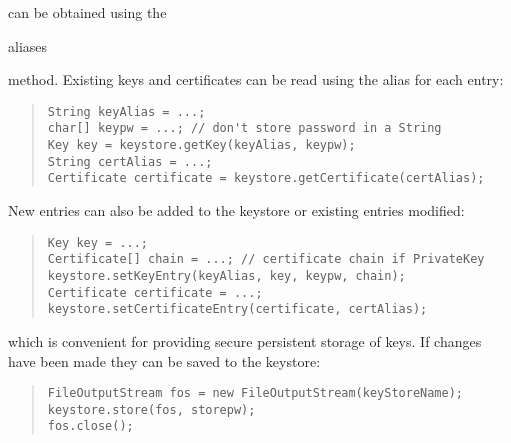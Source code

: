 can be obtained using the \begin{code}aliases\end{code} method.
Existing keys and certificates can be read using the alias for each entry:
\begin{quote}\begin{code}\begin{verbatim}
String keyAlias = ...;
char[] keypw = ...; // don't store password in a String
Key key = keystore.getKey(keyAlias, keypw);
String certAlias = ...;
Certificate certificate = keystore.getCertificate(certAlias);
\end{verbatim}\end{code}\end{quote}
New entries can also be added to the keystore or existing entries modified:
\begin{quote}\begin{code}\begin{verbatim}
Key key = ...;
Certificate[] chain = ...; // certificate chain if PrivateKey
keystore.setKeyEntry(keyAlias, key, keypw, chain);
Certificate certificate = ...;
keystore.setCertificateEntry(certificate, certAlias);
\end{verbatim}\end{code}\end{quote}
which is convenient for providing secure persistent storage of keys.
If changes have been made they can be saved to the keystore:
\begin{quote}\begin{code}\begin{verbatim}
FileOutputStream fos = new FileOutputStream(keyStoreName);
keystore.store(fos, storepw);
fos.close();
\end{verbatim}\end{code}\end{quote}

